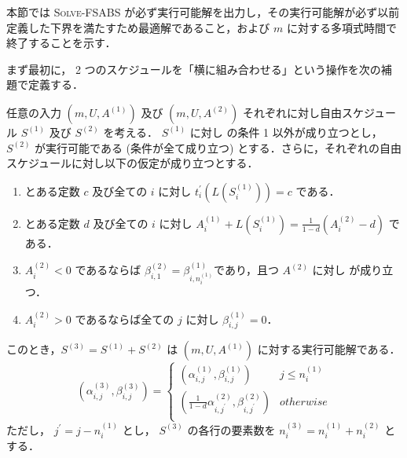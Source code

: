 本節では \textsc{Solve-FSABS} が必ず実行可能解を出力し，その実行可能解が必ず以前定義した下界を満たすため最適解であること，および $m$ に対する多項式時間で終了することを示す．

まず最初に， 2 つのスケジュールを「横に組み合わせる」という操作を次の補題で定義する．

\begin{lemma}\label{lemma:horizontal-composition}
  任意の入力 $(m, U, A^{(1)})$ 及び $(m, U, A^{(2)})$ それぞれに対し自由スケジュール $S^{(1)}$ 及び $S^{(2)}$ を考える． $S^{(1)}$ に対し  の条件 1 以外が成り立つとし， $S^{(2)}$ が実行可能である (条件が全て成り立つ) とする．さらに，それぞれの自由スケジュールに対し以下の仮定が成り立つとする．
  \begin{enumerate}
  \item とある定数 $c$ 及び全ての $i$ に対し $t^\prime_i(L(S^{(1)}_i)) = c$ である． \label{hypothesis:same-arrival}
  \item とある定数 $d$ 及び全ての $i$ に対し $\displaystyle A^{(1)}_i + L(S^{(1)}_i) = \frac{1}{1-d}(A^{(2)}_i - d)$ である．
  \item $A^{(2)}_i < 0$ であるならば $\beta^{(2)}_{i,1} = \beta^{(1)}_{i,n_i^{(1)}}$であり，且つ $A^{(2)}$ に対し  が成り立つ． \label{hypothesis:same-bikes}
  \item $A^{(2)}_i > 0$ であるならば全ての $j$ に対し $\beta^{(1)}_{i,j} = 0$．\label{hypothesis:no-forward-bikes}
  \end{enumerate}
  このとき，$S^{(3)} = S^{(1)} + S^{(2)}$ は $(m, U, A^{(1)})$ に対する実行可能解である．
  \begin{equation}
    (\alpha^{(3)}_{i,j}, \beta^{(3)}_{i,j}) = \begin{cases}
      (\alpha^{(1)}_{i,j}, \beta^{(1)}_{i,j}) & j \leq n_i^{(1)} \\
      (\frac{1}{1 - d}\alpha^{(2)}_{i,j^\prime}, \beta^{(2)}_{i,j^\prime}) & otherwise \\
    \end{cases}
  \end{equation}
  ただし， $j^\prime = j - n_i^{(1)}$ とし， $S^{(3)}$ の各行の要素数を $n_i^{(3)} = n_i^{(1)} + n_i^{(2)}$ とする．
\end{lemma}
